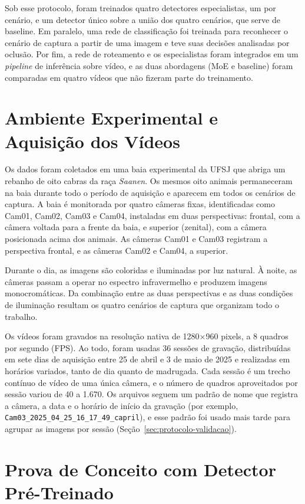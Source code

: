 Sob esse protocolo, foram treinados quatro detectores especialistas, um por cenário, e um detector único sobre a união dos quatro cenários, que serve de baseline. Em paralelo, uma rede de classificação foi treinada para reconhecer o cenário de captura a partir de uma imagem e teve suas decisões analisadas por oclusão. Por fim, a rede de roteamento e os especialistas foram integrados em um \textit{pipeline} de inferência sobre vídeo, e as duas abordagens (MoE e baseline) foram comparadas em quatro vídeos que não fizeram parte do treinamento.

\section{Ambiente Experimental e Aquisição dos Vídeos}
\label{sec:aquisicao}

Os dados foram coletados em uma baia experimental da UFSJ que abriga um rebanho de oito cabras da raça \textit{Saanen}. Os mesmos oito animais permaneceram na baia durante todo o período de aquisição e aparecem em todos os cenários de captura. A baia é monitorada por quatro câmeras fixas, identificadas como Cam01, Cam02, Cam03 e Cam04, instaladas em duas perspectivas: frontal, com a câmera voltada para a frente da baia, e superior (zenital), com a câmera posicionada acima dos animais. As câmeras Cam01 e Cam03 registram a perspectiva frontal, e as câmeras Cam02 e Cam04, a superior.

Durante o dia, as imagens são coloridas e iluminadas por luz natural. À noite, as câmeras passam a operar no espectro infravermelho e produzem imagens monocromáticas. Da combinação entre as duas perspectivas e as duas condições de iluminação resultam os quatro cenários de captura que organizam todo o trabalho.

Os vídeos foram gravados na resolução nativa de 1280$\times$960 pixels, a 8 quadros por segundo (FPS). Ao todo, foram usadas 36 sessões de gravação, distribuídas em sete dias de aquisição entre 25 de abril e 3 de maio de 2025 e realizadas em horários variados, tanto de dia quanto de madrugada. Cada sessão é um trecho contínuo de vídeo de uma única câmera, e o número de quadros aproveitados por sessão variou de 40 a 1.670. Os arquivos seguem um padrão de nome que registra a câmera, a data e o horário de início da gravação (por exemplo, \texttt{Cam03\_2025\_04\_25\_16\_17\_49\_capril}), e esse padrão foi usado mais tarde para agrupar as imagens por sessão (Seção~\ref{sec:protocolo-validacao}).

\section{Prova de Conceito com Detector Pré-Treinado}
\label{sec:prova-conceito}

